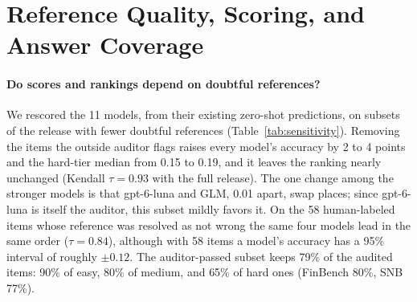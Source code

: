 \section{Reference Quality, Scoring, and Answer Coverage}
\label{app:sensitivity}
\paragraph{Do scores and rankings depend on doubtful references?} We rescored the 11 models, from their existing zero-shot predictions, on subsets of the release with fewer doubtful references (Table~\ref{tab:sensitivity}). Removing the items the outside auditor flags raises every model's accuracy by 2 to 4 points and the hard-tier median from 0.15 to 0.19, and it leaves the ranking nearly unchanged (Kendall $\tau=0.93$ with the full release). The one change among the stronger models is that gpt-6-luna and GLM, 0.01 apart, swap places; since gpt-6-luna is itself the auditor, this subset mildly favors it. On the 58 human-labeled items whose reference was resolved as not wrong the same four models lead in the same order ($\tau=0.84$), although with 58 items a model's accuracy has a 95\% interval of roughly $\pm 0.12$. The auditor-passed subset keeps 79\% of the audited items: 90\% of easy, 80\% of medium, and 65\% of hard ones (FinBench 80\%, SNB 77\%).

